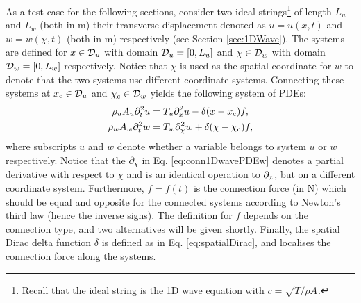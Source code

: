 As a test case for the following sections, consider two ideal strings\footnote{Recall that the ideal string is the 1D wave equation with $c=\sqrt{T/\rho A}$.} of length $L_u$ and $L_w$ (both in m) their transverse displacement denoted as $u=u(x,t)$ and $w = w(\chi,t)$ (both in m) respectively (see Section \ref{sec:1DWave}).  The systems are defined for $x\in \mathcal{D}_u$ with domain $\mathcal{D}_u=[0,L_u]$ and $\chi \in \mathcal{D}_w$ with domain $\mathcal{D}_w=[0,L_w]$ respectively. Notice that $\chi$ is used as the spatial coordinate for $w$ to denote that the two systems use different coordinate systems. Connecting these systems at $x_{\text{c}}\in \mathcal{D}_u$ and $\chi_{\text{c}}\in\mathcal{D}_w$ yields the following system of PDEs:
\begin{subequations}\label{eq:conn1DwavePDE}
    \begin{align}
        \rho_u A_u \partial_t^2 u &= T_u \partial_x^2 u -\delta(x-x_{\text{c}})f, \label{eq:conn1DwavePDEu} \\
        \rho_w A_w \partial_t^2 w &= T_w \partial_\chi^2 w + \delta(\chi-\chi_{\text{c}})f,\label{eq:conn1DwavePDEw}
    \end{align}
\end{subequations}
where subscripts $u$ and $w$ denote whether a variable belongs to system $u$ or $w$ respectively. Notice that the $\partial_\chi$ in Eq. \eqref{eq:conn1DwavePDEw} denotes a partial derivative with respect to $\chi$ and is an identical operation to $\partial_x$, but on a different coordinate system. Furthermore, $f = f(t)$ is the connection force (in N) which should be equal and opposite for the connected systems according to Newton's third law (hence the inverse signs). The definition for $f$ depends on the connection type, and two alternatives will be given shortly. Finally, the spatial Dirac delta function $\delta$ is defined as in Eq. \eqref{eq:spatialDirac}, and localises the connection force along the systems. 

